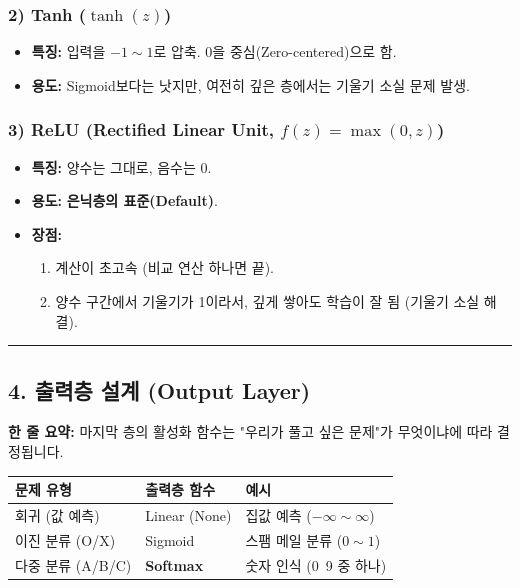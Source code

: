 \documentclass[11pt,a4paper]{book}
\theoremstyle{definition}
\begin{document}
\subsubsection*{2) Tanh ($\tanh(z)$)}
\begin{itemize}
    \item \textbf{특징:} 입력을 $-1 \sim 1$로 압축. 0을 중심(Zero-centered)으로 함.
    \item \textbf{용도:} Sigmoid보다는 낫지만, 여전히 깊은 층에서는 기울기 소실 문제 발생.
\end{itemize}

\subsubsection*{3) ReLU (Rectified Linear Unit, $f(z) = \max(0, z)$)}
\begin{itemize}
    \item \textbf{특징:} 양수는 그대로, 음수는 0.
    \item \textbf{용도:} \textbf{은닉층의 표준(Default)}.
    \item \textbf{장점:}
    \begin{enumerate}
        \item 계산이 초고속 (비교 연산 하나면 끝).
        \item 양수 구간에서 기울기가 1이라서, 깊게 쌓아도 학습이 잘 됨 (기울기 소실 해결).
    \end{enumerate}
\end{itemize}

\vspace{0.5cm}\hrule\vspace{0.5cm}

\subsection{4. 출력층 설계 (Output Layer)}

\begin{conceptbox}[title={개념 3: 문제 유형에 따른 마무으리}]
\textbf{한 줄 요약:} 마지막 층의 활성화 함수는 "우리가 풀고 싶은 문제"가 무엇이냐에 따라 결정됩니다.
\end{conceptbox}

\begin{table}[h]
\centering
\begin{tabular}{l|l|l}
\toprule
\textbf{문제 유형} & \textbf{출력층 함수} & \textbf{예시} \\
\midrule
회귀 (값 예측) & Linear (None) & 집값 예측 ($-\infty \sim \infty$) \\
이진 분류 (O/X) & Sigmoid & 스팸 메일 분류 ($0 \sim 1$) \\
다중 분류 (A/B/C) & \textbf{Softmax} & 숫자 인식 (0~9 중 하나) \\
\bottomrule
\end{tabular}
\end{table}
\end{document}
